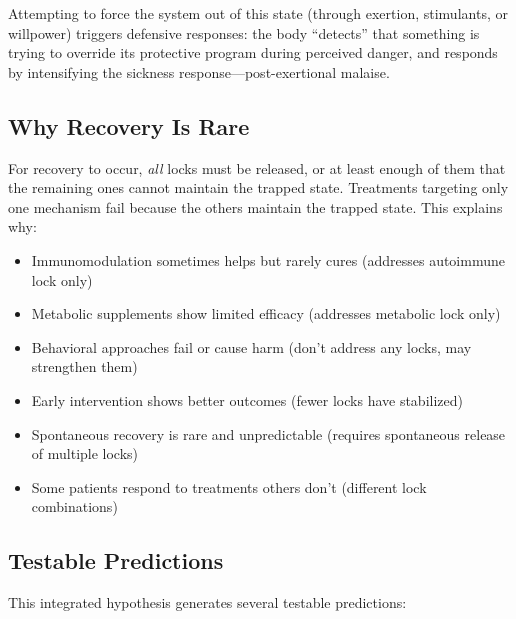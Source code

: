 Attempting to force the system out of this state (through exertion, stimulants, or willpower) triggers defensive responses: the body ``detects'' that something is trying to override its protective program during perceived danger, and responds by intensifying the sickness response---post-exertional malaise.

\subsection{Why Recovery Is Rare}

For recovery to occur, \emph{all} locks must be released, or at least enough of them that the remaining ones cannot maintain the trapped state. Treatments targeting only one mechanism fail because the others maintain the trapped state. This explains why:

\begin{itemize}
    \item Immunomodulation sometimes helps but rarely cures (addresses autoimmune lock only)
    \item Metabolic supplements show limited efficacy (addresses metabolic lock only)
    \item Behavioral approaches fail or cause harm (don't address any locks, may strengthen them)
    \item Early intervention shows better outcomes (fewer locks have stabilized)
    \item Spontaneous recovery is rare and unpredictable (requires spontaneous release of multiple locks)
    \item Some patients respond to treatments others don't (different lock combinations)
\end{itemize}

\subsection{Testable Predictions}

This integrated hypothesis generates several testable predictions:

